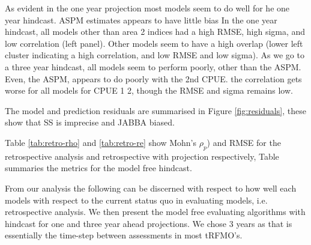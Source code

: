 \documentclass[a4paper]{article}
\begin{document}
As evident in the one year projection most models seem to do well for he one year hindcast. ASPM estimates appears to have little bias In the one year hindcast, all models other than area 2 indices had a high RMSE, high sigma, and low correlation (left panel). Other models seem to have a high overlap (lower left cluster indicating a high correlation, and low RMSE and low sigma). As we go to a three year hindcast, all models seem to perform poorly, other than the ASPM. Even, the ASPM, appears to do poorly with the 2nd CPUE. the correlation gets worse for all models for CPUE 1 2, though the RMSE and sigma remains low. 

The model and prediction residuals are summarised in Figure \ref{fig:residuals}, these show that SS is imprecise and JABBA biased.


Table \ref{tab:retro-rho} and  \ref{tab:retro-re} show Mohn's $\rho_{p}$) and RMSE for the retrospective analysis and retrospective with projection respectively, Table \label{tab:rmse} summaries the metrics for the model free hindcast.

From our analysis the following can be discerned with respect to how well each models with respect to the current status quo in evaluating models, i.e. retrospective analysis. We then present the model free evaluating algorithms with hindcast for one and three year ahead projections. We chose 3 years as that is essentially the time-step between assessments in most tRFMO's.
\end{document}
